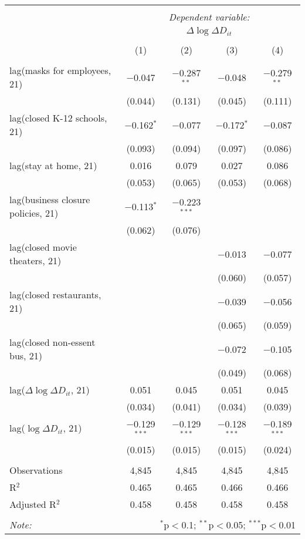 \begin{tabular}{@{\extracolsep{1pt}}lcccc} 
\\[-1.8ex]\hline 
\hline \\[-1.8ex] 
 & \multicolumn{4}{c}{\textit{Dependent variable:}} \\ 
\cline{2-5} 
 & \multicolumn{4}{c}{$\Delta \log \Delta D_{it}$} \\ 
\\[-1.8ex] & (1) & (2) & (3) & (4)\\ 
\hline \\[-1.8ex] 
 lag(masks for employees, 21) & $-$0.047 & $-$0.287$^{**}$ & $-$0.048 & $-$0.279$^{**}$ \\ 
  & (0.044) & (0.131) & (0.045) & (0.111) \\ 
  lag(closed K-12 schools, 21) & $-$0.162$^{*}$ & $-$0.077 & $-$0.172$^{*}$ & $-$0.087 \\ 
  & (0.093) & (0.094) & (0.097) & (0.086) \\ 
  lag(stay at home, 21) & 0.016 & 0.079 & 0.027 & 0.086 \\ 
  & (0.053) & (0.065) & (0.053) & (0.068) \\ 
  lag(business closure policies, 21) & $-$0.113$^{*}$ & $-$0.223$^{***}$ &  &  \\ 
  & (0.062) & (0.076) &  &  \\ 
  lag(closed movie theaters, 21) &  &  & $-$0.013 & $-$0.077 \\ 
  &  &  & (0.060) & (0.057) \\ 
  lag(closed restaurants, 21) &  &  & $-$0.039 & $-$0.056 \\ 
  &  &  & (0.065) & (0.059) \\ 
  lag(closed non-essent bus, 21) &  &  & $-$0.072 & $-$0.105 \\ 
  &  &  & (0.049) & (0.068) \\ 
  lag($\Delta \log \Delta D_{it}$, 21) & 0.051 & 0.045 & 0.051 & 0.045 \\ 
  & (0.034) & (0.041) & (0.034) & (0.039) \\ 
  lag($\log \Delta D_{it}$, 21) & $-$0.129$^{***}$ & $-$0.129$^{***}$ & $-$0.128$^{***}$ & $-$0.189$^{***}$ \\ 
  & (0.015) & (0.015) & (0.015) & (0.024) \\ 
 \hline \\[-1.8ex] 
Observations & 4,845 & 4,845 & 4,845 & 4,845 \\ 
R$^{2}$ & 0.465 & 0.465 & 0.466 & 0.466 \\ 
Adjusted R$^{2}$ & 0.458 & 0.458 & 0.458 & 0.458 \\ 
\hline 
\hline \\[-1.8ex] 
\textit{Note:}  & \multicolumn{4}{r}{$^{*}$p$<$0.1; $^{**}$p$<$0.05; $^{***}$p$<$0.01} \\ 
\end{tabular} 